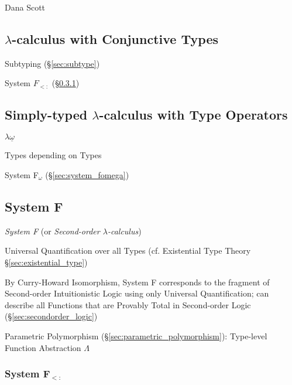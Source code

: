 Dana Scott %



\subsection{$\lambda$-calculus with Conjunctive Types}
\label{sec:conjunctive_lambda}

Subtyping (\S\ref{sec:subtype})

System $F_{<:}$ (\S\ref{sec:system_fsub})



\subsection{Simply-typed $\lambda$-calculus with Type Operators}
\label{sec:simply_operators}

$\lambda\underline{\omega}$

Types depending on Types

System F$_\omega$ (\S\ref{sec:system_fomega})



\subsection{System F}\label{sec:system_f}

\emph{System F} (or \emph{Second-order $\lambda$-calculus})

Universal Quantification over all Types (cf. Existential Type Theory
\S\ref{sec:existential_type})

By Curry-Howard Isomorphism, System F corresponds to the fragment of
Second-order Intuitionistic Logic using only Universal Quantification;
can describe all Functions that are Provably Total in Second-order
Logic (\S\ref{sec:secondorder_logic})

Parametric Polymorphism (\S\ref{sec:parametric_polymorphism}):
Type-level Function Abstraction $\Lambda$



\subsubsection{System F$_{<:}$}\label{sec:system_fsub}

